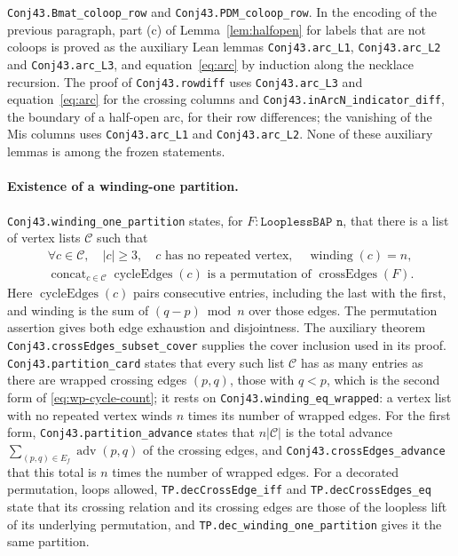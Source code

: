 \documentclass[11pt]{article}
\theoremstyle{definition}
\begin{document}
\texttt{Conj43.\allowbreak Bmat\_\allowbreak coloop\_\allowbreak row} and \texttt{Conj43.\allowbreak PDM\_\allowbreak coloop\_\allowbreak row}. In the encoding of the previous
paragraph, part (c) of Lemma~\ref{lem:halfopen} for labels that are not coloops is proved as the
auxiliary Lean lemmas \texttt{Conj43.\allowbreak arc\_\allowbreak L1}, \texttt{Conj43.\allowbreak arc\_\allowbreak L2} and \texttt{Conj43.\allowbreak arc\_\allowbreak L3}, and
equation~\eqref{eq:arc} by induction along the necklace recursion. The proof of
\texttt{Conj43.\allowbreak rowdiff} uses \texttt{Conj43.\allowbreak arc\_\allowbreak L3} and
equation~\eqref{eq:arc} for the crossing columns and \texttt{Conj43.\allowbreak inArcN\_\allowbreak indicator\_\allowbreak diff}, the boundary of a
half-open arc, for their row differences; the vanishing of the Mis columns uses
\texttt{Conj43.\allowbreak arc\_\allowbreak L1} and \texttt{Conj43.\allowbreak arc\_\allowbreak L2}. None of these auxiliary lemmas is among
the frozen statements.

\paragraph{Existence of a winding-one partition.}
\texttt{Conj43.\allowbreak winding\_\allowbreak one\_\allowbreak partition} states, for $F:\texttt{LooplessBAP n}$,
that there is a list of vertex lists $\mathcal C$ such that
\[
 \begin{gathered}
  \forall c\in\mathcal C,\quad |c|\ge3,\quad c\text{ has no repeated vertex},
       \quad\operatorname{winding}(c)=n,\\
  \mathop{\mathrm{concat}}_{c\in\mathcal C}\operatorname{cycleEdges}(c)
       \text{ is a permutation of }\operatorname{crossEdges}(F).
 \end{gathered}
\]
Here $\operatorname{cycleEdges}(c)$ pairs consecutive entries, including the
last with the first, and winding is the sum of $(q-p)\bmod n$ over those edges.
The permutation assertion gives both edge exhaustion and disjointness.
The auxiliary theorem \texttt{Conj43.\allowbreak crossEdges\_\allowbreak subset\_\allowbreak cover} supplies the
cover inclusion used in its proof. \texttt{Conj43.\allowbreak partition\_\allowbreak card} states that every such list $\mathcal C$ has as
many entries as there are wrapped crossing edges $(p,q)$, those with $q<p$, which is the second form of
\eqref{eq:wp-cycle-count}; it rests on \texttt{Conj43.\allowbreak winding\_\allowbreak eq\_\allowbreak wrapped}: a vertex list with no repeated
vertex winds $n$ times its number of wrapped edges. For the first form,
\texttt{Conj43.\allowbreak partition\_\allowbreak advance} states that $n|\mathcal C|$ is the total advance
$\sum_{(p,q)\in E_f}\operatorname{adv}(p,q)$ of the crossing edges, and
\texttt{Conj43.\allowbreak crossEdges\_\allowbreak advance} that this total is $n$ times the number of wrapped edges. For a decorated permutation, loops allowed,
\texttt{TP.\allowbreak decCrossEdge\_\allowbreak iff} and \texttt{TP.\allowbreak decCrossEdges\_\allowbreak eq} state that its crossing relation and its
crossing edges are those of the loopless lift of its
underlying permutation, and \texttt{TP.\allowbreak dec\_\allowbreak winding\_\allowbreak one\_\allowbreak partition} gives it the same
partition.
\end{document}
